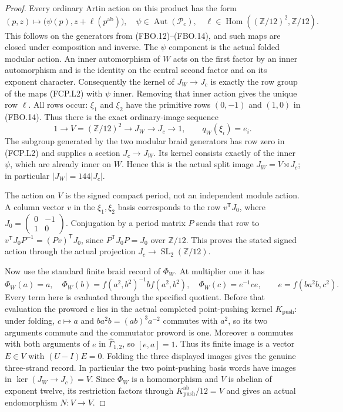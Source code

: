 \begin{proof}
Every ordinary Artin action on this product has the form
\[
          (p,z)\longmapsto
                \bigl(\psi(p),z+\ell(p^{\mathrm{ab}})\bigr),
 \quad\psi\in\operatorname{Aut}(\mathcal P_c),\quad
 \ell\in\operatorname{Hom}((\mathbb Z/12)^2,\mathbb Z/12).
                                                               \tag{FCP.L2}
\]
This follows on the generators from (FBO.12)--(FBO.14),
and such maps are closed under composition and inverse.
The $\psi$ component is the actual folded modular action.
An inner automorphism of $W$ acts on the first factor by
an inner automorphism and is the identity on the central
second factor and on its exponent character.
Consequently the kernel of $J_W\to J_c$ is exactly the
row group of the maps (FCP.L2) with $\psi$ inner.
Removing that inner action gives the unique row $\ell$.
All rows occur: $\xi_1$ and $\xi_2$ have the primitive
rows $(0,-1)$ and $(1,0)$ in (FBO.14).
Thus there is the exact ordinary-image sequence
\[
 1\longrightarrow V=(\mathbb Z/12)^2
      \longrightarrow J_W\longrightarrow J_c\longrightarrow1,
 \qquad q_W(\xi_i)=e_i.
                                                               \tag{FCP.L3}
\]
The subgroup generated by the two modular braid generators
has row zero in (FCP.L2) and supplies a section $J_c\to J_W$.
Its kernel consists exactly of the inner $\psi$, which are
already inner on $W$.  Hence this is the actual split image
$J_W=V\rtimes J_c$; in particular $|J_W|=144|J_c|$.

The action on $V$ is the signed compact period, not an
independent module action.  A column vector $v$ in the
$\xi_1,\xi_2$ basis corresponds to the row
$v^{\mathsf T}J_0$, where
$J_0=\left(\begin{smallmatrix}0&-1\\1&0\end{smallmatrix}\right)$.
Conjugation by a period matrix $P$ sends that row to
$v^{\mathsf T}J_0P^{-1}=(Pv)^{\mathsf T}J_0$, since
$P^{\mathsf T}J_0P=J_0$ over $\mathbb Z/12$.
This proves the stated signed action through the actual
projection $J_c\to\operatorname{SL}_2(\mathbb Z/12)$.

Now use the standard finite braid record of $\Phi_W$.
At multiplier one it has
\[
 \Phi_W(a)=a,\quad
 \Phi_W(b)=f(a^2,b^2)^{-1}bf(a^2,b^2),\quad
 \Phi_W(c)=e^{-1}ce,\qquad e=f(ba^2b,c^2).
                                                               \tag{FCP.L4}
\]
Every term here is evaluated through the specified quotient.
Before that evaluation the proword $e$ lies in the actual
completed point-pushing kernel $K_{\mathrm{push}}$:
under folding, $c\mapsto a$ and
$ba^2b=(ab)^3a^{-2}$ commutes with $a^2$, so its two
arguments commute and the commutator proword is one.
Moreover $a$ commutes with both arguments of $e$ in
$\widehat\Gamma_{1,2}$, so $[e,a]=1$.
Thus its finite image is a vector $E\in V$ with
$(U-I)E=0$.
Folding the three displayed images gives the genuine
three-strand record.  In particular the two point-pushing
basis words have images in $\ker(J_W\to J_c)=V$.
Since $\Phi_W$ is a homomorphism and $V$ is abelian of
exponent twelve, its restriction factors through
$K_{\mathrm{push}}^{\mathrm{ab}}/12=V$ and gives an
actual endomorphism $N:V\to V$.


\end{proof}
